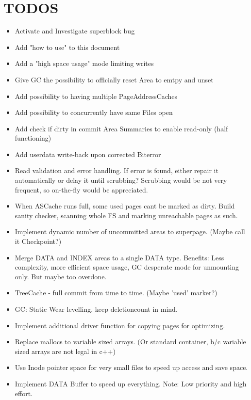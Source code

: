 \section{TODOS}
\begin{itemize}
    \item Activate and Investigate superblock bug
    \item Add "how to use" to this document
    \item Add a "high space usage" mode limiting writes 
    \item Give GC the possibility to officially reset Area to emtpy and unset
    \item Add possibility to having multiple PageAddressCaches
    \item Add possibility to concurrently have same Files open
    \item Add check if dirty in commit Area Summaries to enable read-only (half functioning)
    \item Add userdata write-back upon corrected Biterror
    \item Read validation and error handling. If error is found, either repair it automatically or delay it until scrubbing? Scrubbing would be not very frequent, so on-the-fly would be appreciated.
	\item When ASCache runs full, some used pages cant be marked as dirty. Build sanity checker, scanning whole FS and marking unreachable pages as such.
	\item Implement dynamic number of uncommitted areas to superpage. (Maybe call it Checkpoint?)
	\item Merge DATA and INDEX areas to a single DATA type. Benefits: Less complexity, more efficient space usage, GC desperate mode for unmounting only. But maybe too overdone.
	\item TreeCache - full commit from time to time. (Maybe 'used' marker?)
	\item GC: Static Wear levelling, keep deletioncount in mind.
	\item Implement additional driver function for copying pages for optimizing.
	\item Replace mallocs to variable sized arrays. (Or standard container, b/c variable sized arrays are not legal in c++)
	\item Use Inode pointer space for very small files to speed up access and save space.
	\item Implement DATA Buffer to speed up everything. Note: Low priority and high effort.
\end{itemize}
